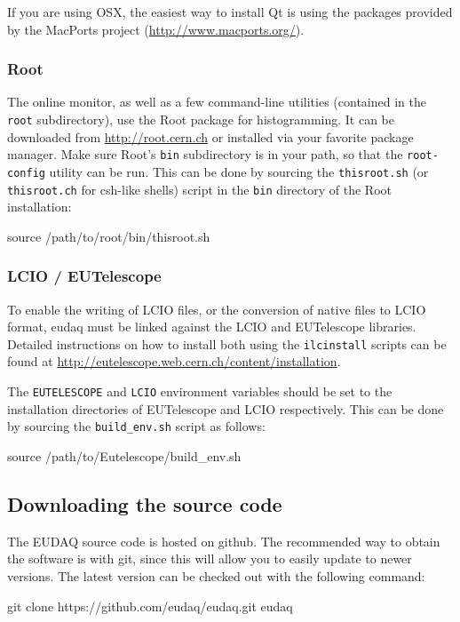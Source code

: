 If you are using OSX, the easiest way to install Qt is using the
packages provided by the MacPorts project (\url{http://www.macports.org/}).

\subsubsection{Root}\label{sec:Root}
The online monitor, as well as a few command-line utilities (contained in the \texttt{root} subdirectory),
use the Root package for histogramming.
It can be downloaded from \url{http://root.cern.ch} or installed via
your favorite package manager.
Make sure Root's \texttt{bin} subdirectory is in your path, so that the \texttt{root-config} utility can be run.
This can be done by sourcing the \texttt{thisroot.sh} (or \texttt{thisroot.ch} for csh-like shells)
script in the \texttt{bin} directory of the Root installation:
\begin{listing}[mybash]
source /path/to/root/bin/thisroot.sh
\end{listing}

\subsubsection{LCIO / EUTelescope}\label{sec:LCIO-EUTel}
To enable the writing of \gls{LCIO} files, or the conversion of native files to \gls{LCIO} format,
eudaq must be linked against the \gls{LCIO} and EUTelescope libraries.
Detailed instructions on how to install both using the
\texttt{ilcinstall} scripts can be found at \url{http://eutelescope.web.cern.ch/content/installation}.

The \texttt{EUTELESCOPE} and \texttt{LCIO} environment variables should be set to the
installation directories of EUTelescope and LCIO respectively.
This can be done by sourcing the \texttt{build\_env.sh} script as follows:
\begin{listing}[mybash]
source /path/to/Eutelescope/build_env.sh
\end{listing}

\subsection{Downloading the source code}
The EUDAQ source code is hosted on github. The recommended way to obtain the software is with git,
since this will allow you to easily update to newer versions.
The latest version can be checked out with the following command:
\begin{listing}[mybash]
git clone https://github.com/eudaq/eudaq.git eudaq
\end{listing}

